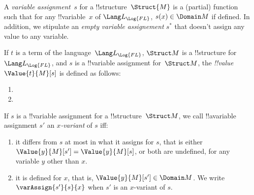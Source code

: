 \documentclass[../../../../include/open-logic-section]{subfiles}
\begin{document}
    \begin{defn}
        A \emph{variable assignment}~$s$ for a !!{structure}~$\Struct{M}$ is a
        (partial) function such that for any !!{variable}~$x$ of
        $\Lang L_{\Log{FL}}$, $s(x) \in \Domain M$ if defined. In addition, we stipulate
        an \emph{empty variable assignement} $s^{*}$ that doesn't assign any value to
        any variable.
        \end{defn}
        
        \begin{defn}
        If $t$ is a term of the language~$\Lang L_{\Log{FL}}$, $\Struct M$ is a
        !!{structure} for~$\Lang L_{\Log{FL}}$, and $s$ is a !!{variable} assignment
        for~$\Struct M$, the \emph{!!{value}}~$\Value{t}{M}[s]$ is defined as
        follows:
        \begin{enumerate}
        \item {}
        \item {}
        \end{enumerate}
\end{defn}


\begin{defn}[$x$-Variant]
    If $s$ is a !!{variable} assignment for a !!{structure}~$\Struct M$, we
    call !!a{variable} assignment $s'$ an \emph{$x$-variant} of $s$ iff:
    \begin{enumerate}
    \item it differs from $s$ at most in what it assigns for $s$, that is 
    either $\Value{y}{M}[s'] = \Value{y}{M}[s]$, or both are undefined, for
    any variable $y$ other than $x$.
    \item it is defined for $x$, that is, $\Value{y}{M}[s'] \in \Domain M$.
    We write $\varAssign{s'}{s}{x}$ when $s'$ is an $x$-variant of $s$.
    \end{enumerate}
\end{defn}
        
\end{document}
